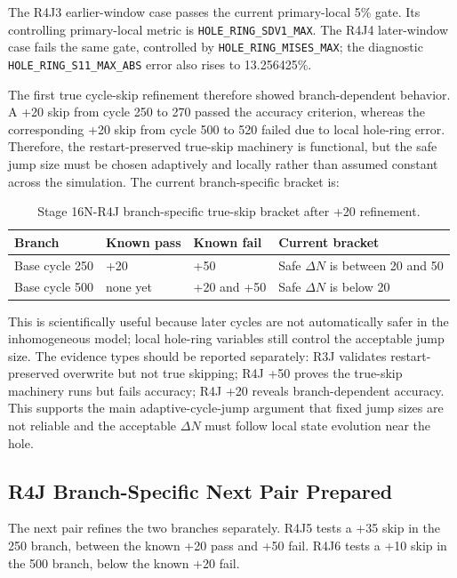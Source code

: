 \documentclass[11pt,a4paper]{article}
\newcommand{\code}[1]{\texttt{#1}}
\begin{document}
The R4J3 earlier-window case passes the current primary-local 5\% gate. Its controlling primary-local metric is \code{HOLE\_RING\_SDV1\_MAX}. The R4J4 later-window case fails the same gate, controlled by \code{HOLE\_RING\_MISES\_MAX}; the diagnostic \code{HOLE\_RING\_S11\_MAX\_ABS} error also rises to 13.256425\%.

The first true cycle-skip refinement therefore showed branch-dependent behavior. A +20 skip from cycle 250 to 270 passed the accuracy criterion, whereas the corresponding +20 skip from cycle 500 to 520 failed due to local hole-ring error. Therefore, the restart-preserved true-skip machinery is functional, but the safe jump size must be chosen adaptively and locally rather than assumed constant across the simulation. The current branch-specific bracket is:

\begin{table}[H]
\centering
\caption{Stage 16N-R4J branch-specific true-skip bracket after +20 refinement.}
\begin{tabular}{llll}
\toprule
Branch & Known pass & Known fail & Current bracket \\
\midrule
Base cycle 250 & +20 & +50 & Safe $\Delta N$ is between 20 and 50 \\
Base cycle 500 & none yet & +20 and +50 & Safe $\Delta N$ is below 20 \\
\bottomrule
\end{tabular}
\end{table}

This is scientifically useful because later cycles are not automatically safer in the inhomogeneous model; local hole-ring variables still control the acceptable jump size. The evidence types should be reported separately: R3J validates restart-preserved overwrite but not true skipping; R4J +50 proves the true-skip machinery runs but fails accuracy; R4J +20 reveals branch-dependent accuracy. This supports the main adaptive-cycle-jump argument that fixed jump sizes are not reliable and the acceptable $\Delta N$ must follow local state evolution near the hole.

\subsection{R4J Branch-Specific Next Pair Prepared}

The next pair refines the two branches separately. R4J5 tests a +35 skip in the 250 branch, between the known +20 pass and +50 fail. R4J6 tests a +10 skip in the 500 branch, below the known +20 fail.
\end{document}
